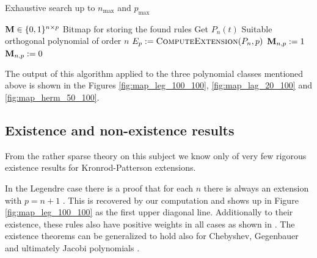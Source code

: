 \documentclass[a4paper,10pt]{article}
\begin{document}
\begin{algorithm}
  \caption{Exhaustive search up to $n_{\textrm{max}}$ and $p_{\textrm{max}}$}
  \label{alg:exhaustive_search}
  \begin{algorithmic}
      \State $\mathbf{M} \in \{0,1\}^{n \times p}$
      \Comment Bitmap for storing the found rules
        \State Get $P_n(t)$
        \Comment Suitable orthogonal polynomial of order $n$
          \State $E_p := \textsc{ComputeExtension}(P_n, p)$
            \State $\mathbf{M}_{n,p} := 1$
          \Else
            \State $\mathbf{M}_{n,p} := 0$
          \EndIf
        \EndFor
      \EndFor
    \EndProcedure
  \end{algorithmic}
\end{algorithm}

The output of this algorithm applied to the three polynomial classes mentioned
above is shown in the Figures \ref{fig:map_leg_100_100}, \ref{fig:map_lag_20_100}
and \ref{fig:map_herm_50_100}.


\subsection{Existence and non-existence results}

From the rather sparse theory on this subject we know only of very few rigorous
existence results for Kronrod-Patterson extensions.

In the Legendre case there is a proof that for each $n$ there is
always an extension with $p = n + 1$ \cite{szegoe}. This is recovered by our
computation and shows up in Figure \ref{fig:map_leg_100_100} as the first upper
diagonal line. Additionally to their existence, these rules also have positive
weights in all cases as shown in \cite{monegato1978}. The existence theorems can
be generalized to hold also for Chebyshev, Gegenbauer and ultimately Jacobi
polynomials \cite{gautschi-notaris, gautschi, notaris1990, monegato1978_2}.
\end{document}
